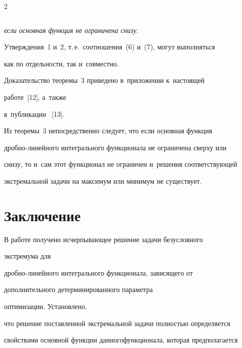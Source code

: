 \begin{multicols}{2}
\begin{enumerate}[1.]
\begin{equation}
\label{e7-shn}

\end{equation}

\textit{если основная функция не ограничена снизу}.

\end{enumerate}

     Утверждения~1 и~2, т.\,е.\ соотношения~(6) и~(7), могут выполняться 

как по от\-дель\-ности, так и~со\-вместно.

     

     \smallskip

     

     Доказательство тео\-ре\-мы~3 приведено в~приложении к~на\-сто\-ящей 

работе~[12], а~так\-же  

в~пуб\-ли\-ка\-ции~ [13].

     

     \smallskip

     

     Из теоремы~3 непосредственно следует, что если основная функция 

дроб\-но-ли\-ней\-но\-го интегрального функционала не ограничена сверху или 

снизу, то и~сам этот функционал не ограничен и~решения соответствующей 

экстремальной задачи на максимум или минимум не существует.



\section{Заключение}



     В работе получено исчерпывающее решение задачи безуслов\-но\-го 

экстремума для  

дроб\-но-ли\-ней\-но\-го интегрального функционала, зависящего от 

дополнительного детерминированного па\-ра\-мет\-ра\linebreak

 оптимизации. Установлено, 

что решение по\-став\-лен\-ной экстремальной задачи пол\-ностью опреде\-ляется 

свойствами основной функции данного\linebreak функционала, которая предполагается 


\end{multicols}
